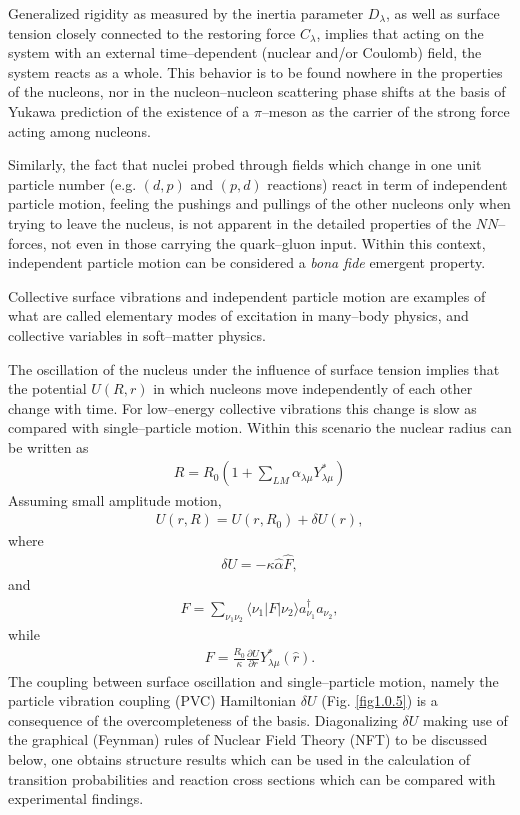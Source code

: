 \documentclass[a4paper,11pt]{book}
\numberwithin{equation}{section}
\numberwithin{figure}{section}
\numberwithin{table}{section}
\newcommand{\ket}[1]{|{#1} \rangle }
\newcommand{\bra}[1]{\langle {#1}|}
\begin{document}
Generalized rigidity as measured by the inertia parameter $D_\lambda$, as well as surface tension closely connected to the restoring force $C_\lambda$, implies that acting on the system with an external time--dependent (nuclear and/or Coulomb) field, the system reacts as a whole. This behavior is to be found nowhere in the properties of the nucleons, nor in the nucleon--nucleon scattering phase shifts at the basis of Yukawa prediction of the existence of a $\pi$--meson as the carrier of the strong force acting among nucleons.


Similarly, the fact that nuclei probed through fields which change in one unit particle number (e.g. $(d,p)$ and $(p,d)$ reactions) react in term of independent particle motion,  feeling the pushings and pullings of the other nucleons only when trying to leave the nucleus, is not apparent in the detailed properties of the $NN$--forces, not even in those carrying the quark--gluon input. Within this context, independent particle motion can be considered a \textit{bona fide} emergent property.


Collective surface vibrations and independent particle motion are examples of what are called elementary modes of excitation in many--body physics, and collective variables in soft--matter physics.


The oscillation of the nucleus under the influence of surface tension implies that the potential $U(R,r)$ in which nucleons move independently of each other change with time. For low--energy collective vibrations this change is slow as compared with single--particle motion. Within this scenario the nuclear radius can be written as  
\begin{align}\label{eq1.0.12}
R=R_0\left(1+\sum_{LM}\alpha_{\lambda\mu}Y_{\lambda\mu}^*\right)
\end{align}
Assuming small amplitude motion,
\begin{align}\label{eq1.0.13}
U(r,R)=U(r,R_0)+\delta U(r),
\end{align}
where
\begin{align}\label{eq1.0.14}
\delta U=-\kappa\hat \alpha \hat F,
\end{align}
and
\begin{align}\label{eq1.0.15}
\hat F=\sum_{\nu_1\nu_2}\bra{\nu_1}F\ket{\nu_2}a_{\nu_1}^\dagger a_{\nu_2},
\end{align}
while
\begin{align}\label{eq1.0.16}
F=\frac{R_0}{\kappa}\frac{\partial U}{\partial r}Y^*_{\lambda\mu}(\hat r).
\end{align}
The coupling between surface oscillation and single--particle motion, namely the particle vibration coupling (PVC) Hamiltonian $\delta U$ (Fig. \ref{fig1.0.5}) is a consequence of the overcompleteness of the basis. Diagonalizing $\delta U$ making use of the graphical (Feynman) rules of Nuclear Field Theory (NFT) to be discussed below, one obtains structure results which can be used in the calculation of transition probabilities and reaction cross sections which can be compared with experimental findings.
\end{document}
